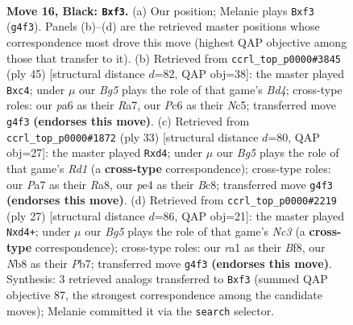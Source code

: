\documentclass[11pt]{article}
\begin{document}
\begin{figure}[p]
\label{fig:thought-m29}
\end{figure}

\clearpage

\begin{figure}[p]\centering
\begin{subfigure}{0.46\textwidth}\centering
\resizebox{\linewidth}{!}{%
\newchessgame
\chessboard[
  setfen={rn1r1k1b/p4p1p/P1p2np1/4p3/4P1bP/2N2N2/2P1BP2/R1B2RK1 b - - 0 16},
  showmover=false,
  pgfstyle=straightmove, color=movearrow, markmove={g4-f3}
]}
\caption{}
\end{subfigure}\hfill
\begin{subfigure}{0.46\textwidth}\centering
\resizebox{\linewidth}{!}{%
\newchessgame
\chessboard[
  setfen={2r3k1/r4p2/1p2pn2/pBnb2pp/P1N5/2P1P2P/1P4PB/R2R2K1 b - - 1 23},
  showmover=false,
  pgfstyle=straightmove, color=movearrow, markmove={d5-c4}
]}
\caption{}
\end{subfigure}
\\[4pt]
\begin{subfigure}{0.46\textwidth}\centering
\resizebox{\linewidth}{!}{%
\newchessgame
\chessboard[
  setfen={r1brn1k1/ppn1pp2/2p4p/6p1/N1PN4/6PP/1P1BPPB1/R4RK1 b - - 0 17},
  showmover=false,
  pgfstyle=straightmove, color=movearrow, markmove={d8-d4}
]}
\caption{}
\end{subfigure}\hfill
\begin{subfigure}{0.46\textwidth}\centering
\resizebox{\linewidth}{!}{%
\newchessgame
\chessboard[
  setfen={2r1kb1r/pp3ppp/2n1p3/P2n4/2NN4/2P5/1P2KPPP/R1BR4 b k - 0 14},
  showmover=false,
  pgfstyle=straightmove, color=movearrow, markmove={c6-d4}
]}
\caption{}
\end{subfigure}
\caption{\textbf{Move 16, Black: \texttt{Bxf3}.} (a) Our position; Melanie plays \texttt{Bxf3} (\texttt{g4f3}). Panels (b)--(d) are the retrieved master positions whose correspondence most drove this move (highest QAP objective among those that transfer to it). (b) Retrieved from \texttt{ccrl\_top\_p0000\#3845} (ply 45) [structural distance $d$=82, QAP obj=38]: the master played \texttt{Bxc4}; under $\mu$ our \emph{Bg5} plays the role of that game's \emph{Bd4}; cross-type roles: our \emph{p}a6 as their \emph{R}a7, our \emph{P}c6 as their \emph{N}c5; transferred move \texttt{g4f3} \textbf{(endorses this move)}. (c) Retrieved from \texttt{ccrl\_top\_p0000\#1872} (ply 33) [structural distance $d$=80, QAP obj=27]: the master played \texttt{Rxd4}; under $\mu$ our \emph{Bg5} plays the role of that game's \emph{Rd1} (a \textbf{cross-type} correspondence); cross-type roles: our \emph{P}a7 as their \emph{R}a8, our \emph{p}e4 as their \emph{B}c8; transferred move \texttt{g4f3} \textbf{(endorses this move)}. (d) Retrieved from \texttt{ccrl\_top\_p0000\#2219} (ply 27) [structural distance $d$=86, QAP obj=21]: the master played \texttt{Nxd4+}; under $\mu$ our \emph{Bg5} plays the role of that game's \emph{Nc3} (a \textbf{cross-type} correspondence); cross-type roles: our \emph{r}a1 as their \emph{B}f8, our \emph{N}b8 as their \emph{P}b7; transferred move \texttt{g4f3} \textbf{(endorses this move)}. Synthesis: 3 retrieved analogs transferred to \texttt{Bxf3} (summed QAP objective 87, the strongest correspondence among the candidate moves); Melanie committed it via the \texttt{search} selector.}

\end{figure}
\end{document}
